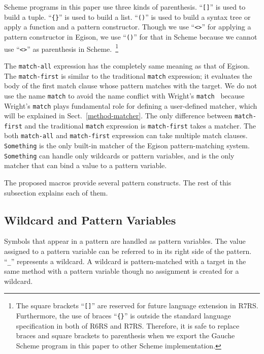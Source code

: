 \documentclass[acmlarge]{acmart}
\newcommand{\new}[1]{\textcolor{blue}{#1}}
\begin{document}
Scheme programs in this paper use three kinds of parenthesis.
``\lstinline{[]}'' is used to build a tuple.
``\texttt{\{\}}'' is used to build a list. %
``\lstinline{()}'' is used to build a syntax tree or apply a function and a pattern constructor.
Though we use ``\lstinline{<>}'' for applying a pattern constructor in Egison, we use ``\lstinline{()}'' for that in Scheme because we cannot use ``\lstinline{<>}'' as parenthesis in Scheme.~\footnote{The square brackets ``\lstinline{[]}'' are reserved for future language extension in R7RS.
Furthermore, the use of braces ``\texttt{\{\}}'' is outside the standard language specification in both of R6RS and R7RS.
Therefore, it is safe to replace braces and square brackets to parenthesis when we export the Gauche Scheme program in this paper to other Scheme implementation.
}

The \texttt{match-all} expression has the completely same meaning as that of Egison.
The \texttt{match-first} is similar to the traditional \texttt{match} expression; it evaluates the body of the first match clause whose pattern matches with the target.
We do not use the name \texttt{match} to avoid the name conflict with Wright's \texttt{match}~\cite{wright1993pattern} because Wright's \texttt{match} plays fundamental role for defining a user-defined matcher, which will be explained in Sect.~\ref{method-matcher}.
The only difference between \texttt{match-first} and the traditional \texttt{match} expression is \texttt{match-first} takes a matcher.
The both \texttt{match-all} and \texttt{match-first} expression can take multiple match clauses.
\lstinline{Something} is the only built-in matcher of the Egison pattern-matching system.
\lstinline{Something} can handle only wildcards or pattern variables, and is the only matcher that can bind a value to a pattern variable.

The proposed macros provide several pattern constructs.
The rest of this subsection explains each of them.

\subsection{Wildcard and Pattern Variables}

Symbols that appear in a pattern are handled as pattern variables.
The value assigned to a pattern variable can be referred to in its right side of the pattern.
``\lstinline{_}'' represents a wildcard.
A wildcard is pattern-matched with a target in the same method with a pattern variable though no assignment is created for a wildcard.
\end{document}
